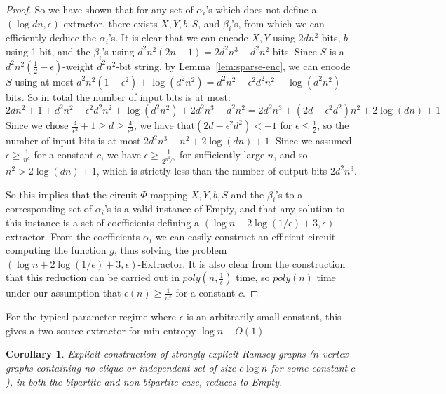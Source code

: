 \documentclass[11pt]{article}
\newtheorem{corollary}{Corollary}
\begin{document}
\begin{proof}
So we have shown that for any set of $\alpha_i$'s which does not define a $(\log dn, \epsilon)$ extractor, there exists $X,Y,b,S$, and $\beta_i$'s, from which we can efficiently deduce the $\alpha_i$'s. It is clear that we can encode $X,Y$ using $2dn^2$ bits, $b$ using 1 bit, and the $\beta_i$'s using $d^2n^2(2n-1) = 2d^2n^3 - d^2n^2$ bits. Since $S$ is a $d^2n^2(\frac{1}{2} - \epsilon)$-weight $d^2n^2$-bit string, by Lemma~\ref{lem:sparse-enc}, we can encode $S$ using at most $d^2n^2(1 - \epsilon^2) + \log(d^2n^2) = d^2n^2 - \epsilon^2d^2n^2 + \log(d^2n^2)$ bits. So in total the number of input bits is at most:
\[
2dn^2 + 1 + d^2n^2 - \epsilon^2d^2n^2 + \log(d^2n^2) + 2d^2n^3 - d^2n^2 = 2d^2n^3 + (2d-\epsilon^2d^2)n^2 + 2\log(dn) + 1
\]
Since we chose $\frac{4}{\epsilon^2} + 1 \geq d \geq \frac{4}{\epsilon^2}$, we have that$(2d - \epsilon^2d^2) < -1$ for $\epsilon \leq \frac{1}{2}$, so the number of input bits is at most $2d^2n^3 - n^2 + 2\log(dn) + 1$. Since we assumed $\epsilon \geq \frac{1}{n^c}$ for a constant $c$, we have $\epsilon \geq \frac{1}{2^{n^2/5}}$ for sufficiently large $n$, and so $n^2 > 2\log(dn) + 1$, which is strictly less than the number of output bits $2d^2n^3$.

So this implies that the circuit $\Phi$ mapping $X,Y,b,S$ and the $\beta_i$'s to a corresponding set of $\alpha_i$'s is a valid instance of {\sc Empty}, and that any solution to this instance is a set of coefficients defining a $(\log n + 2\log(1/\epsilon) + 3, \epsilon)$ extractor. From the coefficients $\alpha_i$ we can easily construct an efficient circuit computing the function $g   $, thus solving the problem {\sc $(\log n + 2\log(1/\epsilon) + 3, \epsilon)$-Extractor}. It is also clear from the construction that this reduction can be carried out in $poly(n, \frac{1}{\epsilon})$ time, so $poly(n)$ time under our assumption that $\epsilon(n) \geq \frac{1}{n^c}$ for a constant $c$.
\end{proof}

For the typical parameter regime where $\epsilon$ is an arbitrarily small constant, this gives a two source extractor for min-entropy $\log n + O(1)$.

\begin{corollary}
Explicit construction of strongly explicit Ramsey graphs ($n$-vertex graphs containing no clique or independent set of size $c\log n$ for some constant $c$), in both the bipartite and non-bipartite case, reduces to {\sc Empty}.
\end{corollary}
\end{document}
